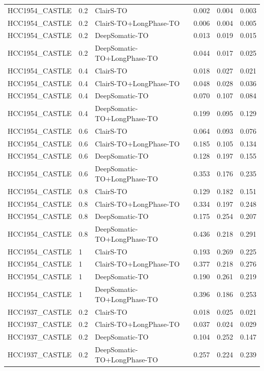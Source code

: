 \documentclass[pdflatex,sn-nature]{sn-jnl}
\begin{document}
{\begin{longtable}{@{}lllccc@{}}
  \addlinespace
  HCC1954\_CASTLE & 0.2 & ClairS-TO & 0.002 & 0.004 & 0.003 \\
  HCC1954\_CASTLE & 0.2 & ClairS-TO+LongPhase-TO & 0.006 & 0.004 & 0.005 \\
  HCC1954\_CASTLE & 0.2 & DeepSomatic-TO & 0.013 & 0.019 & 0.015 \\
  HCC1954\_CASTLE & 0.2 & DeepSomatic-TO+LongPhase-TO & 0.044 & 0.017 & 0.025 \\
  HCC1954\_CASTLE & 0.4 & ClairS-TO & 0.018 & 0.027 & 0.021 \\
  HCC1954\_CASTLE & 0.4 & ClairS-TO+LongPhase-TO & 0.048 & 0.028 & 0.036 \\
  HCC1954\_CASTLE & 0.4 & DeepSomatic-TO & 0.070 & 0.107 & 0.084 \\
  HCC1954\_CASTLE & 0.4 & DeepSomatic-TO+LongPhase-TO & 0.199 & 0.095 & 0.129 \\
  HCC1954\_CASTLE & 0.6 & ClairS-TO & 0.064 & 0.093 & 0.076 \\
  HCC1954\_CASTLE & 0.6 & ClairS-TO+LongPhase-TO & 0.185 & 0.105 & 0.134 \\
  HCC1954\_CASTLE & 0.6 & DeepSomatic-TO & 0.128 & 0.197 & 0.155 \\
  HCC1954\_CASTLE & 0.6 & DeepSomatic-TO+LongPhase-TO & 0.353 & 0.176 & 0.235 \\
  HCC1954\_CASTLE & 0.8 & ClairS-TO & 0.129 & 0.182 & 0.151 \\
  HCC1954\_CASTLE & 0.8 & ClairS-TO+LongPhase-TO & 0.334 & 0.197 & 0.248 \\
  HCC1954\_CASTLE & 0.8 & DeepSomatic-TO & 0.175 & 0.254 & 0.207 \\
  HCC1954\_CASTLE & 0.8 & DeepSomatic-TO+LongPhase-TO & 0.436 & 0.218 & 0.291 \\
  HCC1954\_CASTLE & 1 & ClairS-TO & 0.193 & 0.269 & 0.225 \\
  HCC1954\_CASTLE & 1 & ClairS-TO+LongPhase-TO & 0.377 & 0.218 & 0.276 \\
  HCC1954\_CASTLE & 1 & DeepSomatic-TO & 0.190 & 0.261 & 0.219 \\
  HCC1954\_CASTLE & 1 & DeepSomatic-TO+LongPhase-TO & 0.396 & 0.186 & 0.253 \\
  \addlinespace
  HCC1937\_CASTLE & 0.2 & ClairS-TO & 0.018 & 0.025 & 0.021 \\
  HCC1937\_CASTLE & 0.2 & ClairS-TO+LongPhase-TO & 0.037 & 0.024 & 0.029 \\
  HCC1937\_CASTLE & 0.2 & DeepSomatic-TO & 0.104 & 0.252 & 0.147 \\
  HCC1937\_CASTLE & 0.2 & DeepSomatic-TO+LongPhase-TO & 0.257 & 0.224 & 0.239 \\

\end{longtable}}
\end{document}
